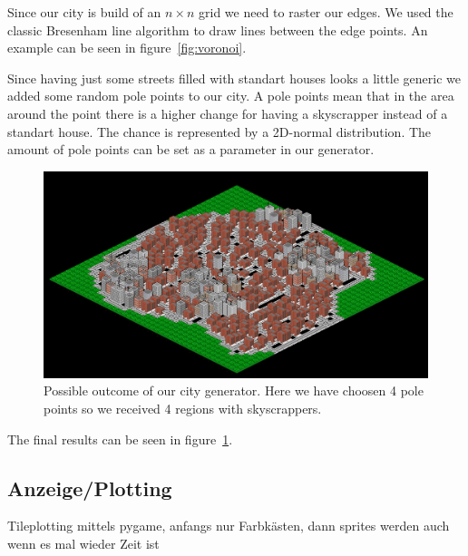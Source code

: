 \documentclass{scrartcl}
\begin{document}
Since our city is build of an $n\times n$ grid we need to raster our edges.
We used the classic Bresenham line algorithm to draw lines between the edge points.
An example can be seen in figure~\ref{fig:voronoi}.

Since having just some streets filled with standart houses looks a little
generic we added some random pole points to our city.
A pole points mean that in the area around the point there is a higher change
for having a skyscrapper instead of a standart house. The chance is represented
by a 2D-normal distribution.
The amount of pole points can be set as a parameter in our generator.

\begin{figure}
    \centering
    \includegraphics[scale = 1.2]{city1}
    \caption{Possible outcome of our city generator. Here we have choosen 4 pole
    points so we received 4 regions with skyscrappers.}
    \label{fig:city_example}
\end{figure}

The final results can be seen in figure~\ref{fig:city_example}.


\subsection{Anzeige/Plotting}
Tileplotting mittels pygame, anfangs nur Farbkästen, dann sprites werden auch
wenn es mal wieder Zeit ist 
\end{document}
